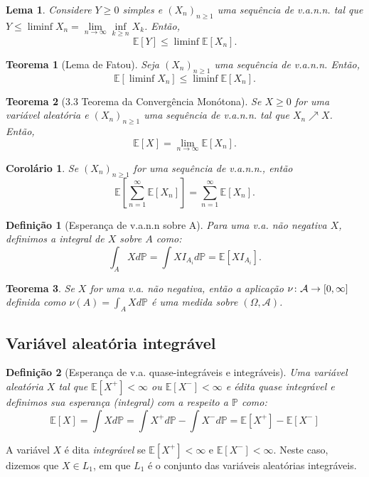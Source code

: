 \documentclass[12pt,a4paper,answers]{article}
\numberwithin{equation}{section} %
\renewcommand{\P}{\mathbb{P}}
\newcommand{\E}{\mathbb{E}}
\newcommand{\Acal}{\mathcal{A}}
\theoremstyle{thm_estilo}
\newtheorem{theorem}{Teorema}[section]
\newtheorem{definition}{Definição}[section]
\newtheorem{lemma}{Lema}[section]
\newtheorem{corollary}{Corolário}[section]
\theoremstyle{thm_note_est}
\begin{document}
\begin{lemma}
	Considere $Y\geq0$ simples e $(X_n)_{n\geq1}$ uma sequência de v.a.n.n. tal que $Y\leq\liminf X_n = \lim\limits_{n\to\infty}\inf\limits_{k\geq n}X_k$. Então,
	 \[
	 	\E[Y] \leq \liminf \E[X_n].
	 \]
\end{lemma}

\begin{theorem}[Lema de Fatou]
	Seja $(X_n)_{n\geq1}$ uma sequência de v.a.n.n. Então,
	\[
		\E[\liminf X_n] \leq \liminf\E[X_n].
	\]
\end{theorem}

\begin{theorem}[3.3 Teorema da Convergência Monótona]
	Se $X\geq0$ for uma variável aleatória e $(X_n)_{n\geq1}$ uma sequência de v.a.n.n. tal que \(X_n\nearrow X\). Então,
	\[
		\E[X] = \lim\limits_{n\to\infty}\E[X_n].
	\]
\end{theorem}

\begin{corollary}
	Se $(X_n)_{n\geq1}$ for uma sequência de v.a.n.n., então
	\[
		\E \left[ \sum_{n=1}^{\infty}\E[X_n] \right] = \sum_{n=1}^{\infty}\E[X_n].
	\]
\end{corollary}

\begin{definition}[Esperança de v.a.n.n sobre A]
	Para uma v.a. não negativa $X$, definimos a integral de $X$ sobre $A$ como:
	\begin{equation}
		\int_A X d\P = \int X I_{A_i}d\P = \E[X I_{A_i}].
	\end{equation}
\end{definition}

\begin{theorem}
	Se $X$ for uma v.a. não negativa, então a aplicação \(\mathmbox{\nu\colon \Acal \to [0, \infty]}\) definida como \(\nu(A) = \int_A X d\P\) é uma medida sobre $(\Omega, \Acal)$.
\end{theorem}

\subsection{Variável aleatória integrável}

\begin{definition}[Esperança de v.a. quase-integráveis e integráveis]
	Uma variável aleatória $X$ tal que $\E[X^+]<\infty$ ou $\E[X^-]<\infty$ e édita \textit{quase integrável} e definimos sua esperança (integral) com a respeito a $\P$ como:
	\begin{equation}
		\E[X] = \int X d\P = \int X^+ d\P - \int X^- d\P = \E[X^+]-\E[X^-]
	\end{equation}
\end{definition}
	A variável $X$ é dita \textit{integrável} se $\E[X^+]<\infty$ e $\E[X^-]<\infty$. Neste caso, dizemos que $X\in L_1$, em que $L_1$ é o conjunto das variáveis aleatórias integráveis.
	
\end{document}
